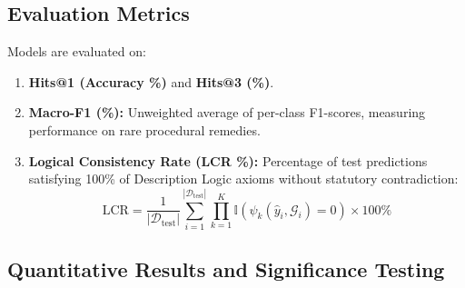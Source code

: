 \documentclass[11pt,a4paper]{article}
\begin{document}
\subsection{Evaluation Metrics}
Models are evaluated on:
\begin{enumerate}
    \item \textbf{Hits@1 (Accuracy \%)} and \textbf{Hits@3 (\%)}.
    \item \textbf{Macro-F1 (\%):} Unweighted average of per-class F1-scores, measuring performance on rare procedural remedies.
    \item \textbf{Logical Consistency Rate (LCR \%):} Percentage of test predictions satisfying 100\% of Description Logic axioms without statutory contradiction:
    \begin{equation}
    \text{LCR} = \frac{1}{|\mathcal{D}_{\text{test}}|} \sum_{i=1}^{|\mathcal{D}_{\text{test}}|} \prod_{k=1}^K \mathbb{I}(\psi_k(\hat{y}_i, \mathcal{G}_i) = 0) \times 100\%
    \end{equation}
\end{enumerate}

\subsection{Quantitative Results and Significance Testing}
\end{document}
